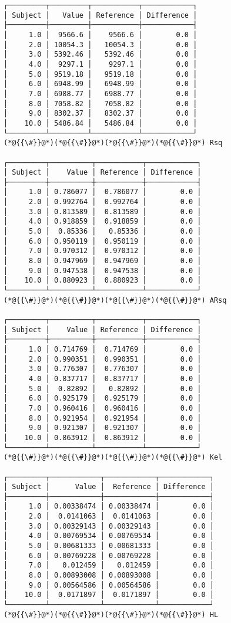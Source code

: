 \documentclass[12pt,a4paper]{article}
\begin{document}
\begin{lstlisting}
┌─────────┬─────────┬───────────┬────────────┐
│ Subject │   Value │ Reference │ Difference │
├─────────┼─────────┼───────────┼────────────┤
│     1.0 │  9566.6 │    9566.6 │        0.0 │
│     2.0 │ 10054.3 │   10054.3 │        0.0 │
│     3.0 │ 5392.46 │   5392.46 │        0.0 │
│     4.0 │  9297.1 │    9297.1 │        0.0 │
│     5.0 │ 9519.18 │   9519.18 │        0.0 │
│     6.0 │ 6948.99 │   6948.99 │        0.0 │
│     7.0 │ 6988.77 │   6988.77 │        0.0 │
│     8.0 │ 7058.82 │   7058.82 │        0.0 │
│     9.0 │ 8302.37 │   8302.37 │        0.0 │
│    10.0 │ 5486.84 │   5486.84 │        0.0 │
└─────────┴─────────┴───────────┴────────────┘
(*@{{\#}}@*)(*@{{\#}}@*)(*@{{\#}}@*)(*@{{\#}}@*) Rsq

┌─────────┬──────────┬───────────┬────────────┐
│ Subject │    Value │ Reference │ Difference │
├─────────┼──────────┼───────────┼────────────┤
│     1.0 │ 0.786077 │  0.786077 │        0.0 │
│     2.0 │ 0.992764 │  0.992764 │        0.0 │
│     3.0 │ 0.813589 │  0.813589 │        0.0 │
│     4.0 │ 0.918859 │  0.918859 │        0.0 │
│     5.0 │  0.85336 │   0.85336 │        0.0 │
│     6.0 │ 0.950119 │  0.950119 │        0.0 │
│     7.0 │ 0.970312 │  0.970312 │        0.0 │
│     8.0 │ 0.947969 │  0.947969 │        0.0 │
│     9.0 │ 0.947538 │  0.947538 │        0.0 │
│    10.0 │ 0.880923 │  0.880923 │        0.0 │
└─────────┴──────────┴───────────┴────────────┘
(*@{{\#}}@*)(*@{{\#}}@*)(*@{{\#}}@*)(*@{{\#}}@*) ARsq

┌─────────┬──────────┬───────────┬────────────┐
│ Subject │    Value │ Reference │ Difference │
├─────────┼──────────┼───────────┼────────────┤
│     1.0 │ 0.714769 │  0.714769 │        0.0 │
│     2.0 │ 0.990351 │  0.990351 │        0.0 │
│     3.0 │ 0.776307 │  0.776307 │        0.0 │
│     4.0 │ 0.837717 │  0.837717 │        0.0 │
│     5.0 │  0.82892 │   0.82892 │        0.0 │
│     6.0 │ 0.925179 │  0.925179 │        0.0 │
│     7.0 │ 0.960416 │  0.960416 │        0.0 │
│     8.0 │ 0.921954 │  0.921954 │        0.0 │
│     9.0 │ 0.921307 │  0.921307 │        0.0 │
│    10.0 │ 0.863912 │  0.863912 │        0.0 │
└─────────┴──────────┴───────────┴────────────┘
(*@{{\#}}@*)(*@{{\#}}@*)(*@{{\#}}@*)(*@{{\#}}@*) Kel

┌─────────┬────────────┬────────────┬────────────┐
│ Subject │      Value │  Reference │ Difference │
├─────────┼────────────┼────────────┼────────────┤
│     1.0 │ 0.00338474 │ 0.00338474 │        0.0 │
│     2.0 │  0.0141063 │  0.0141063 │        0.0 │
│     3.0 │ 0.00329143 │ 0.00329143 │        0.0 │
│     4.0 │ 0.00769534 │ 0.00769534 │        0.0 │
│     5.0 │ 0.00681333 │ 0.00681333 │        0.0 │
│     6.0 │ 0.00769228 │ 0.00769228 │        0.0 │
│     7.0 │   0.012459 │   0.012459 │        0.0 │
│     8.0 │ 0.00893008 │ 0.00893008 │        0.0 │
│     9.0 │ 0.00564586 │ 0.00564586 │        0.0 │
│    10.0 │  0.0171897 │  0.0171897 │        0.0 │
└─────────┴────────────┴────────────┴────────────┘
(*@{{\#}}@*)(*@{{\#}}@*)(*@{{\#}}@*)(*@{{\#}}@*) HL


\end{lstlisting}
\end{document}
